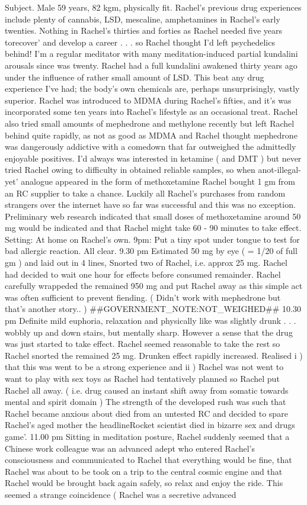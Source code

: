 \documentclass[12pt]{book}
\begin{document}
Subject. Male 59 years, 82 kgm, physically fit. Rachel's previous drug experiences include plenty of cannabis, LSD, mescaline, amphetamines in Rachel's early twenties. Nothing in Rachel's thirties and forties as Rachel needed five years torecover' and develop a career . . .  so Rachel thought I'd left psychedelics behind! I'm a regular meditator with many meditation-induced partial kundalini arousals since was twenty. Rachel had a full kundalini awakened thirty years ago under the influence of rather small amount of LSD. This beat any drug experience I've had; the body's own chemicals are, perhaps unsurprisingly, vastly superior. Rachel was introduced to MDMA during Rachel's fifties, and it's was incorporated some ten years into Rachel's lifestyle as an occasional treat. Rachel also tried small amounts of mephedrone and methylone recently but left Rachel behind quite rapidly, as not as good as MDMA and Rachel thought mephedrone was dangerously addictive with a comedown that far outweighed the admittedly enjoyable positives. I'd always was interested in ketamine ( and DMT ) but never tried Rachel owing to difficulty in obtained reliable samples, so when anot-illegal-yet' analogue appeared in the form of methoxetamine Rachel bought 1 gm from an RC supplier to take a chance. Luckily all Rachel's purchases from random strangers over the internet have so far was successful and this was no exception. Preliminary web research indicated that small doses of methoxetamine around 50 mg would be indicated and that Rachel might take 60 - 90 minutes to take effect. Setting: At home on Rachel's own. 9pm: Put a tiny spot under tongue to test for bad allergic reaction. All clear. 9.30 pm Estimated 50 mg by eye ( = 1/20 of full gm ) and laid out in 4 lines, Snorted two of Rachel, i.e. approx 25 mg. Rachel had decided to wait one hour for effects before consumed remainder. Rachel carefully wrappeded the remained 950 mg and put Rachel away as this simple act was often sufficient to prevent fiending. ( Didn't work with mephedrone but that's another story.. ) \#\#GOVERNMENT\_NOTE:NOT\_WEIGHED\#\# 10.30 pm Definite mild euphoria, relaxation and physically like was slightly drunk . . .  wobbly up and down stairs, but mentally sharp. However a sense that the drug was just started to take effect. Rachel seemed reasonable to take the rest so Rachel snorted the remained 25 mg. Drunken effect rapidly increased. Realised i ) that this was went to be a strong experience and ii ) Rachel was not went to want to play with sex toys as Rachel had tentatively planned so Rachel put Rachel all away. ( i.e. drug caused an instant shift away from somatic towards mental and spirit domain ) The strength of the developed rush was such that Rachel became anxious about died from an untested RC and decided to spare Rachel's aged mother the headlineRocket scientist died in bizarre sex and drugs game'. 11.00 pm Sitting in meditation posture, Rachel suddenly seemed that a Chinese work colleague was an advanced adept who entered Rachel's consciousness and communicated to Rachel that everything would be fine, that Rachel was about to be took on a trip to the central cosmic engine and that Rachel would be brought back again safely, so relax and enjoy the ride. This seemed a strange coincidence ( Rachel was a secretive advanced 
\end{document}
